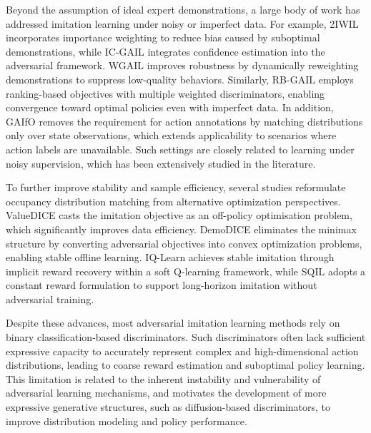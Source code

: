 \documentclass[journal]{IEEEtran}
\begin{document}
Beyond the assumption of ideal expert demonstrations, a large body of work has addressed imitation learning under noisy or imperfect data. For example, 2IWIL\cite{wu2019imitation} incorporates importance weighting to reduce bias caused by suboptimal demonstrations, while IC-GAIL\cite{wu2019imitation} integrates confidence estimation into the adversarial framework. WGAIL\cite{wang2021learning} improves robustness by dynamically reweighting demonstrations to suppress low-quality behaviors. Similarly, RB-GAIL\cite{shi2024ranking} employs ranking-based objectives with multiple weighted discriminators, enabling convergence toward optimal policies even with imperfect data. In addition, GAIfO\cite{torabi2018generative} removes the requirement for action annotations by matching distributions only over state observations, which extends applicability to scenarios where action labels are unavailable. Such settings are closely related to learning under noisy supervision, which has been extensively studied in the literature\cite{song2022learning}.

To further improve stability and sample efficiency, several studies reformulate occupancy distribution matching from alternative optimization perspectives. ValueDICE\cite{kostrikov2019imitation} casts the imitation objective as an off-policy optimisation problem, which significantly improves data efficiency. DemoDICE\cite{kim2021demodice} eliminates the minimax structure by converting adversarial objectives into convex optimization problems, enabling stable offline learning. IQ-Learn\cite{garg2021iq} achieves stable imitation through implicit reward recovery within a soft Q-learning framework, while SQIL\cite{reddy2019sqil} adopts a constant reward formulation to support long-horizon imitation without adversarial training.

Despite these advances, most adversarial imitation learning methods rely on binary classification-based discriminators. Such discriminators often lack sufficient expressive capacity to accurately represent complex and high-dimensional action distributions, leading to coarse reward estimation and suboptimal policy learning. This limitation is related to the inherent instability and vulnerability of adversarial learning mechanisms\cite{yuan2019adversarial,lai2024diffusion}, and motivates the development of more expressive generative structures, such as diffusion-based discriminators\cite{wang2024diffail}, to improve distribution modeling and policy performance.
\end{document}
